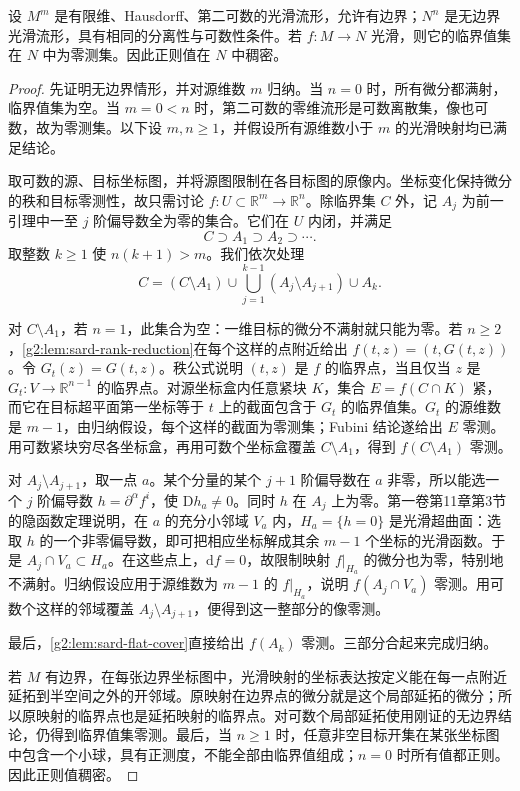 \begin{theorem}[Sard 定理]\label{g2:thm:sard}
	设 \(M^m\) 是有限维、Hausdorff、第二可数的光滑流形，允许有边界；\(N^n\) 是无边界光滑流形，具有相同的分离性与可数性条件。若 \(f:M\to N\) 光滑，则它的临界值集在 \(N\) 中为零测集。因此正则值在 \(N\) 中稠密。
\end{theorem}
\begin{proof}
	先证明无边界情形，并对源维数 \(m\) 归纳。当 \(n=0\) 时，所有微分都满射，临界值集为空。当 \(m=0<n\) 时，第二可数的零维流形是可数离散集，像也可数，故为零测集。以下设 \(m,n\ge1\)，并假设所有源维数小于 \(m\) 的光滑映射均已满足结论。

	取可数的源、目标坐标图，并将源图限制在各目标图的原像内。坐标变化保持微分的秩和目标零测性，故只需讨论 \(f:U\subset\mathbb R^m\to\mathbb R^n\)。除临界集 \(C\) 外，记 \(A_j\) 为前一引理中一至 \(j\) 阶偏导数全为零的集合。它们在 \(U\) 内闭，并满足
	\[
		C\supset A_1\supset A_2\supset\cdots.
	\]
	取整数 \(k\ge1\) 使 \(n(k+1)>m\)。我们依次处理
	\[
		C=(C\setminus A_1)\cup\bigcup_{j=1}^{k-1}(A_j\setminus A_{j+1})\cup A_k.
	\]

	对 \(C\setminus A_1\)，若 \(n=1\)，此集合为空：一维目标的微分不满射就只能为零。若 \(n\ge2\)，\cref{g2:lem:sard-rank-reduction}在每个这样的点附近给出 \(f(t,z)=(t,G(t,z))\)。令 \(G_t(z)=G(t,z)\)。秩公式说明 \((t,z)\) 是 \(f\) 的临界点，当且仅当 \(z\) 是 \(G_t:V\to\mathbb R^{n-1}\) 的临界点。对源坐标盒内任意紧块 \(K\)，集合 \(E=f(C\cap K)\) 紧，而它在目标超平面第一坐标等于 \(t\) 上的截面包含于 \(G_t\) 的临界值集。\(G_t\) 的源维数是 \(m-1\)，由归纳假设，每个这样的截面为零测集；Fubini 结论遂给出 \(E\) 零测。用可数紧块穷尽各坐标盒，再用可数个坐标盒覆盖 \(C\setminus A_1\)，得到 \(f(C\setminus A_1)\) 零测。

	对 \(A_j\setminus A_{j+1}\)，取一点 \(a\)。某个分量的某个 \(j+1\) 阶偏导数在 \(a\) 非零，所以能选一个 \(j\) 阶偏导数 \(h=\partial^\alpha f^i\)，使 \(\mathrm{D}h_a\ne0\)。同时 \(h\) 在 \(A_j\) 上为零。第一卷第11章第3节的隐函数定理说明，在 \(a\) 的充分小邻域 \(V_a\) 内，\(H_a=\{h=0\}\) 是光滑超曲面：选取 \(h\) 的一个非零偏导数，即可把相应坐标解成其余 \(m-1\) 个坐标的光滑函数。于是 \(A_j\cap V_a\subset H_a\)。在这些点上，\(\mathrm{d}f=0\)，故限制映射 \(f|_{H_a}\) 的微分也为零，特别地不满射。归纳假设应用于源维数为 \(m-1\) 的 \(f|_{H_a}\)，说明 \(f(A_j\cap V_a)\) 零测。用可数个这样的邻域覆盖 \(A_j\setminus A_{j+1}\)，便得到这一整部分的像零测。

	最后，\cref{g2:lem:sard-flat-cover}直接给出 \(f(A_k)\) 零测。三部分合起来完成归纳。

	若 \(M\) 有边界，在每张边界坐标图中，光滑映射的坐标表达按定义能在每一点附近延拓到半空间之外的开邻域。原映射在边界点的微分就是这个局部延拓的微分；所以原映射的临界点也是延拓映射的临界点。对可数个局部延拓使用刚证的无边界结论，仍得到临界值集零测。最后，当 \(n\ge1\) 时，任意非空目标开集在某张坐标图中包含一个小球，具有正测度，不能全部由临界值组成；\(n=0\) 时所有值都正则。因此正则值稠密。
\end{proof}

